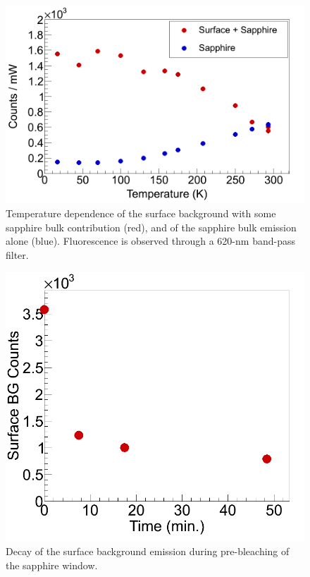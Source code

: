 


\begin{figure} %
        \centering
                \includegraphics[width=.6\textwidth]{figures/bg_temp_dep.png}
                \caption{Temperature dependence of the surface background with some sapphire bulk contribution (red), and of the sapphire bulk emission alone (blue). Fluorescence is observed through a 620-nm band-pass filter.}
\label{fig:BGtempDependence}
\end{figure}

\begin{figure} %
        \centering
                \includegraphics[width=.4\textwidth]{figures/Bleach_SurfaceBG_20150807_part1_vsTime.png}
                \caption{Decay of the surface background emission during pre-bleaching of the sapphire window.}
\label{fig:surfBGbleach}
\end{figure}

